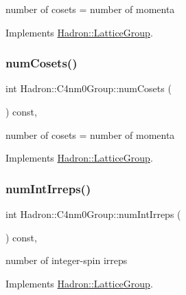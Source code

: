 number of cosets = number of momenta 

Implements \mbox{\hyperlink{structHadron_1_1LatticeGroup_afc76430f36a3a041f86d4058c59bf55e}{Hadron\+::\+Lattice\+Group}}.

\mbox{\label{structHadron_1_1C4nm0Group_ad38f333075aa53f1b0c7bded9f7e70ad}} 
\subsubsection{\texorpdfstring{numCosets()}{numCosets()}\hspace{0.1cm}{\footnotesize\ttfamily [2/2]}}
{\footnotesize\ttfamily int Hadron\+::\+C4nm0\+Group\+::num\+Cosets (\begin{DoxyParamCaption}{ }\end{DoxyParamCaption}) const\hspace{0.3cm}{\ttfamily [inline]}, {\ttfamily [virtual]}}

number of cosets = number of momenta 

Implements \mbox{\hyperlink{structHadron_1_1LatticeGroup_afc76430f36a3a041f86d4058c59bf55e}{Hadron\+::\+Lattice\+Group}}.

\mbox{\label{structHadron_1_1C4nm0Group_aefbae18f6b66563a061d607e680fcab7}} 
\subsubsection{\texorpdfstring{numIntIrreps()}{numIntIrreps()}\hspace{0.1cm}{\footnotesize\ttfamily [1/2]}}
{\footnotesize\ttfamily int Hadron\+::\+C4nm0\+Group\+::num\+Int\+Irreps (\begin{DoxyParamCaption}{ }\end{DoxyParamCaption}) const\hspace{0.3cm}{\ttfamily [inline]}, {\ttfamily [virtual]}}

number of integer-\/spin irreps 

Implements \mbox{\hyperlink{structHadron_1_1LatticeGroup_af2aa7b39222bf188389356eefcef7547}{Hadron\+::\+Lattice\+Group}}.

